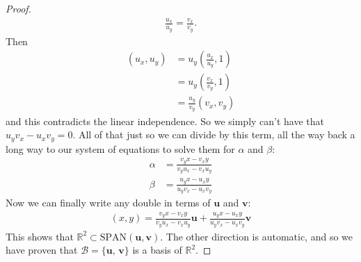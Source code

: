 \begin{proof}
\begin{align*}
\frac{u_x}{u_y} = \frac{v_x}{v_y}.
\end{align*}
Then 
\begin{align*}
(u_x,u_y) &= u_y\left(\frac{u_x}{u_y},1\right) \\
          &= u_y\left(\frac{v_x}{v_y},1\right) \\
          &= \frac{u_y}{v_y}(v_x,v_y)
\end{align*}
and this contradicts the linear independence. So we simply can't have that $u_y  v_x  - u_x v_y=0$. All of that just so we can divide by this term, all the way back a long way to our system of equations to solve them for $\alpha$ and $\beta$:
\begin{align*}
 \alpha &= \frac{v_y x - v_x y}{v_y  u_x  - v_x u_y} \\
  \beta &= \frac{u_y x - u_x y}{u_y  v_x  - u_x v_y} 
\end{align*}
Now we can finally write any double in terms of $\mathbf{u}$ and $\mathbf{v}$:
\begin{align*}
(x,y) = \frac{v_y x - v_x y}{v_y  u_x  - v_x u_y}\mathbf{u} + \frac{u_y x - u_x y}{u_y  v_x  - u_x v_y} \mathbf{v}
\end{align*}
This shows that $\mathbb{R}^2 \subset \text{SPAN}(\mathbf{u},\mathbf{v})$. The other direction is automatic, and so we have proven that $\mathcal{B}=\{ \mathbf{u},\,\mathbf{v} \}$ is a basis of $\mathbb{R}^2$.
\end{proof}

